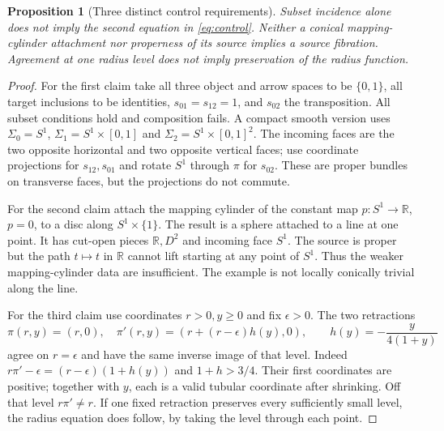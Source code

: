\documentclass[11pt,a4paper]{article}
\newtheorem{proposition}[theorem]{Proposition}
\theoremstyle{definition}
\newcommand{\R}{\mathbb R}
\begin{document}
\begin{proposition}[Three distinct control requirements]\label{prop:control}
Subset incidence alone does not imply the second equation in
\eqref{eq:control}. Neither a conical mapping-cylinder attachment nor
properness of its source implies a source fibration. Agreement at one
radius level does not imply preservation of the radius function.
\end{proposition}
\begin{proof}
For the first claim take all three object and arrow spaces to be
$\{0,1\}$, all target inclusions to be identities, $s_{01}=s_{12}=1$,
and $s_{02}$ the transposition. All subset conditions hold and
composition fails. A compact smooth version uses
$\Sigma_0=S^1$, $\Sigma_1=S^1\times[0,1]$ and
$\Sigma_2=S^1\times[0,1]^2$. The incoming faces are the two opposite
horizontal and two opposite vertical faces; use coordinate projections
for $s_{12},s_{01}$ and rotate $S^1$ through $\pi$ for $s_{02}$.
These are proper bundles on transverse faces, but the projections do
not commute.

For the second claim attach the mapping cylinder of the constant map
$p:S^1\to\R$, $p=0$, to a disc along $S^1\times\{1\}$.
The result is a sphere attached to a line at one point. It has cut-open
pieces $\R,D^2$ and incoming face $S^1$. The source is proper but the
path $t\mapsto t$ in $\R$ cannot lift starting at any point of $S^1$.
Thus the weaker mapping-cylinder data are insufficient. The example is
not locally conically trivial along the line.

For the third claim use coordinates $r>0,y\ge0$ and fix $\epsilon>0$.
The two retractions
\[
 \pi(r,y)=(r,0),\quad
 \pi'(r,y)=\left(r+(r-\epsilon)h(y),0\right),\qquad
 h(y)=-\frac{y}{4(1+y)}
\]
agree on $r=\epsilon$ and have the same inverse image of that level.
Indeed $r\pi'-\epsilon=(r-\epsilon)(1+h(y))$ and $1+h>3/4$.
Their first coordinates are positive; together with $y$, each is a
valid tubular coordinate after shrinking. Off that level $r\pi'\ne r$.
If one fixed retraction preserves every sufficiently small level, the
radius equation does follow, by taking the level through each point.
\end{proof}
\end{document}
